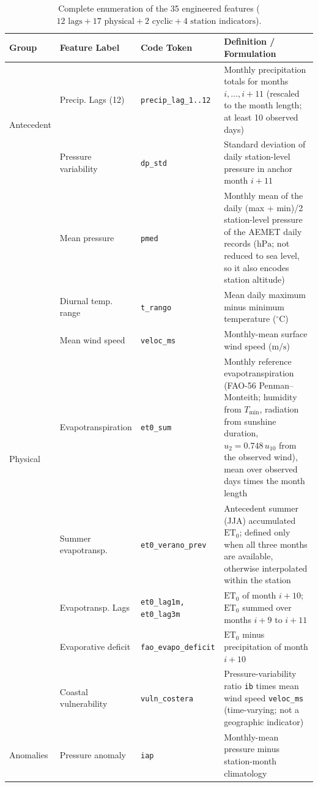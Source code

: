 \documentclass[11pt,a4paper]{article}
\begin{document}
\begin{table}[htbp]
\centering
\caption{Complete enumeration of the 35 engineered features ($12 \text{ lags} + 17 \text{ physical} + 2 \text{ cyclic} + 4 \text{ station indicators}$).}
\label{tab:glossary}
{\small
\begin{tabularx}{\textwidth}{lllX}
\toprule
\textbf{Group} & \textbf{Feature Label} & \textbf{Code Token} & \textbf{Definition / Formulation} \\
\midrule
\multirow{2}{*}{Antecedent} & Precip. Lags (12) & \texttt{precip\_lag\_1..12} & Monthly precipitation totals for months $i, \dots, i+11$ (rescaled to the month length; at least 10 observed days) \\
& Pressure variability & \texttt{dp\_std} & Standard deviation of daily station-level pressure in anchor month $i+11$ \\
\midrule
\multirow{8}{*}{Physical} & Mean pressure & \texttt{pmed} & Monthly mean of the daily (max + min)/2 station-level pressure of the AEMET daily records ($\mathrm{hPa}$; not reduced to sea level, so it also encodes station altitude) \\
& Diurnal temp. range & \texttt{t\_rango} & Mean daily maximum minus minimum temperature ($^\circ\mathrm{C}$) \\
& Mean wind speed & \texttt{veloc\_ms} & Monthly-mean surface wind speed ($\mathrm{m/s}$) \\
& Evapotranspiration & \texttt{et0\_sum} & Monthly reference evapotranspiration (FAO-56 Penman--Monteith; humidity from $T_{\min}$, radiation from sunshine duration, $u_2=0.748\,u_{10}$ from the observed wind), mean over observed days times the month length \\
& Summer evapotransp. & \texttt{et0\_verano\_prev} & Antecedent summer (JJA) accumulated $\text{ET}_0$; defined only when all three months are available, otherwise interpolated within the station \\
& Evapotransp. Lags & \texttt{et0\_lag1m, et0\_lag3m} & $\text{ET}_0$ of month $i+10$; $\text{ET}_0$ summed over months $i+9$ to $i+11$ \\
& Evaporative deficit & \texttt{fao\_evapo\_deficit} & $\text{ET}_0$ minus precipitation of month $i+10$ \\
& Coastal vulnerability & \texttt{vuln\_costera} & Pressure-variability ratio \texttt{ib} times mean wind speed \texttt{veloc\_ms} (time-varying; not a geographic indicator) \\
\midrule
\multirow{3}{*}{Anomalies} & Pressure anomaly & \texttt{iap} & Monthly-mean pressure minus station-month climatology \\

\end{tabularx}}
\end{table}
\end{document}
